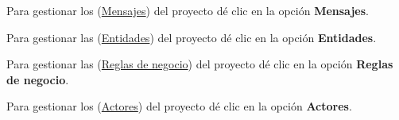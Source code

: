 	Para gestionar los (\hyperlink{cv:registrarProyectoAdmin}{Mensajes}) del proyecto dé clic en la opción \textbf{Mensajes}.
	
	Para gestionar las (\hyperlink{cv:registrarProyectoAdmin}{Entidades}) del proyecto dé clic en la opción \textbf{Entidades}.
	
	Para gestionar las (\hyperlink{cv:registrarProyectoAdmin}{Reglas de negocio}) del proyecto dé clic en la opción \textbf{Reglas de negocio}.
	
	Para gestionar los (\hyperlink{cv:registrarProyectoAdmin}{Actores}) del proyecto dé clic en la opción \textbf{Actores}.
	
\newpage
